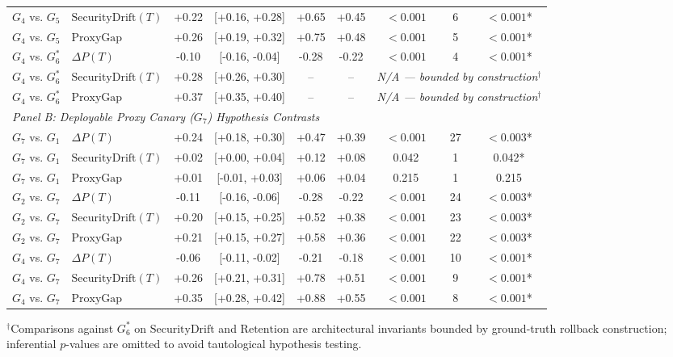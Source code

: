 \begin{table}[t]
\begin{tabular}{llccccccc}
$G_4$ vs. $G_5$ & $\text{SecurityDrift}(T)$ & +0.22 & [+0.16, +0.28] & +0.65 & +0.45 & $<0.001$ & 6 & \textbf{$<0.001$}* \\
$G_4$ vs. $G_5$ & $\text{ProxyGap}$ & +0.26 & [+0.19, +0.32] & +0.75 & +0.48 & $<0.001$ & 5 & \textbf{$<0.001$}* \\
$G_4$ vs. $G_6^*$ & $\Delta P(T)$ & -0.10 & [-0.16, -0.04] & -0.28 & -0.22 & $<0.001$ & 4 & \textbf{$<0.001$}* \\
$G_4$ vs. $G_6^*$ & $\text{SecurityDrift}(T)$ & +0.28 & [+0.26, +0.30] & -- & -- & \multicolumn{3}{c}{\textit{N/A --- bounded by construction}$^{\dagger}$} \\
$G_4$ vs. $G_6^*$ & $\text{ProxyGap}$ & +0.37 & [+0.35, +0.40] & -- & -- & \multicolumn{3}{c}{\textit{N/A --- bounded by construction}$^{\dagger}$} \\
\midrule
\multicolumn{9}{l}{\textit{Panel B: Deployable Proxy Canary ($G_7$) Hypothesis Contrasts}} \\
\midrule
$G_7$ vs. $G_1$ & $\Delta P(T)$ & +0.24 & [+0.18, +0.30] & +0.47 & +0.39 & $<0.001$ & 27 & \textbf{$<0.003$}* \\
$G_7$ vs. $G_1$ & $\text{SecurityDrift}(T)$ & +0.02 & [+0.00, +0.04] & +0.12 & +0.08 & 0.042 & 1 & 0.042* \\
$G_7$ vs. $G_1$ & $\text{ProxyGap}$ & +0.01 & [-0.01, +0.03] & +0.06 & +0.04 & 0.215 & 1 & 0.215 \\
$G_2$ vs. $G_7$ & $\Delta P(T)$ & -0.11 & [-0.16, -0.06] & -0.28 & -0.22 & $<0.001$ & 24 & \textbf{$<0.003$}* \\
$G_2$ vs. $G_7$ & $\text{SecurityDrift}(T)$ & +0.20 & [+0.15, +0.25] & +0.52 & +0.38 & $<0.001$ & 23 & \textbf{$<0.003$}* \\
$G_2$ vs. $G_7$ & $\text{ProxyGap}$ & +0.21 & [+0.15, +0.27] & +0.58 & +0.36 & $<0.001$ & 22 & \textbf{$<0.003$}* \\
$G_4$ vs. $G_7$ & $\Delta P(T)$ & -0.06 & [-0.11, -0.02] & -0.21 & -0.18 & $<0.001$ & 10 & \textbf{$<0.001$}* \\
$G_4$ vs. $G_7$ & $\text{SecurityDrift}(T)$ & +0.26 & [+0.21, +0.31] & +0.78 & +0.51 & $<0.001$ & 9 & \textbf{$<0.001$}* \\
$G_4$ vs. $G_7$ & $\text{ProxyGap}$ & +0.35 & [+0.28, +0.42] & +0.88 & +0.55 & $<0.001$ & 8 & \textbf{$<0.001$}* \\
\bottomrule
\end{tabular}
\vspace{1mm}
\parbox{\linewidth}{\footnotesize{$^{\dagger}$Comparisons against $G_6^*$ on $\text{SecurityDrift}$ and $\text{Retention}$ are architectural invariants bounded by ground-truth rollback construction; inferential $p$-values are omitted to avoid tautological hypothesis testing.}}
\end{table}
